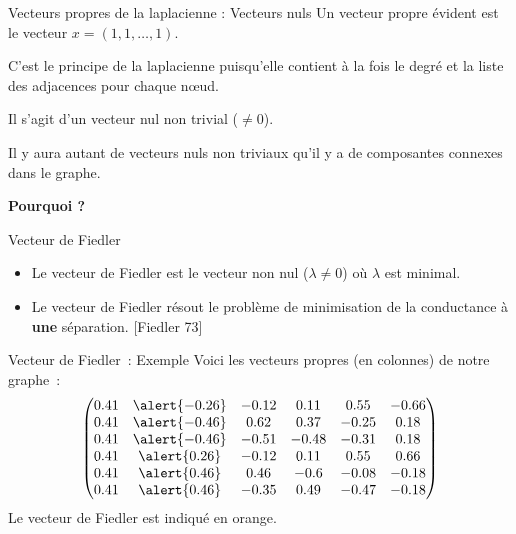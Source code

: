 \begin{frame}{Vecteurs propres de la laplacienne : Vecteurs nuls}
    Un vecteur propre évident est le vecteur $x=(1,1,\dots ,1 )$.
    
    C'est le principe de la laplacienne puisqu'elle contient à la fois le degré et la liste des adjacences pour chaque nœud.
    \vfill

    Il s'agit d'un vecteur nul non trivial ($\neq 0$).
    
    \alert{Il y aura autant de vecteurs nuls non triviaux qu'il y a de composantes connexes dans le graphe.}

    \centering \textbf{Pourquoi ?}
\end{frame}
 
\begin{frame}{Vecteur de Fiedler}
    \begin{itemize}
        \item Le \alert{vecteur de Fiedler} est le vecteur non nul ($\lambda \neq 0$) où $\lambda$ est minimal. 
        \item Le vecteur de Fiedler résout le problème de minimisation de la conductance à \textbf{une} séparation. [Fiedler 73]
    \end{itemize} 
\end{frame}
 
\begin{frame}{Vecteur de Fiedler~: Exemple}
    Voici les vecteurs propres (en colonnes) de notre graphe~:
    {\footnotesize
    $$
    \begin{pmatrix}
        0.41& \alert{-0.26}& -0.12&  0.11&  0.55& -0.66\\
        0.41& \alert{-0.46}&  0.62&  0.37& -0.25&  0.18\\
        0.41& \alert{-0.46}& -0.51& -0.48& -0.31&  0.18\\
        0.41&  \alert{0.26}& -0.12&  0.11&  0.55&  0.66\\
        0.41&  \alert{0.46}&  0.46& -0.6 & -0.08& -0.18\\
        0.41&  \alert{0.46}& -0.35&  0.49& -0.47& -0.18\\
    \end{pmatrix}
    $$}
    Le vecteur de Fiedler est indiqué en \alert{orange}.

\end{frame}

